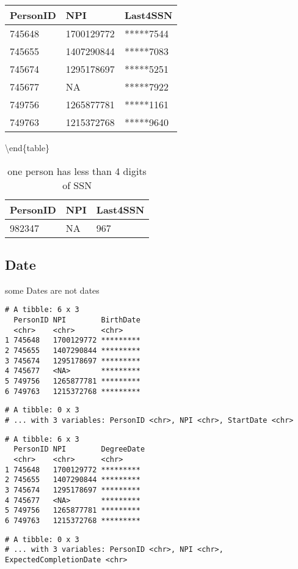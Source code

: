 \documentclass[]{article}
\begin{document}
\begin{tabular}{l|l|l}
\hline
PersonID & NPI & Last4SSN\\
\hline
745648 & 1700129772 & *****7544\\
\hline
745655 & 1407290844 & *****7083\\
\hline
745674 & 1295178697 & *****5251\\
\hline
745677 & NA & *****7922\\
\hline
749756 & 1265877781 & *****1161\\
\hline
749763 & 1215372768 & *****9640\\
\hline
\end{tabular}

\textbackslash{}end\{table\}

\begin{table}[!h]

\caption{\label{tab:SSN}one person has less than 4 digits of SSN}
\centering
\begin{tabular}{l|l|l}
\hline
PersonID & NPI & Last4SSN\\
\hline
982347 & NA & 967\\
\hline
\end{tabular}
\end{table}

\hypertarget{date}{%
\subsection{Date}\label{date}}

some Dates are not dates

\begin{verbatim}
# A tibble: 6 x 3
  PersonID NPI        BirthDate
  <chr>    <chr>      <chr>    
1 745648   1700129772 *********
2 745655   1407290844 *********
3 745674   1295178697 *********
4 745677   <NA>       *********
5 749756   1265877781 *********
6 749763   1215372768 *********
\end{verbatim}

\begin{verbatim}
# A tibble: 0 x 3
# ... with 3 variables: PersonID <chr>, NPI <chr>, StartDate <chr>
\end{verbatim}

\begin{verbatim}
# A tibble: 6 x 3
  PersonID NPI        DegreeDate
  <chr>    <chr>      <chr>     
1 745648   1700129772 ********* 
2 745655   1407290844 ********* 
3 745674   1295178697 ********* 
4 745677   <NA>       ********* 
5 749756   1265877781 ********* 
6 749763   1215372768 ********* 
\end{verbatim}

\begin{verbatim}
# A tibble: 0 x 3
# ... with 3 variables: PersonID <chr>, NPI <chr>, ExpectedCompletionDate <chr>
\end{verbatim}
\end{document}

